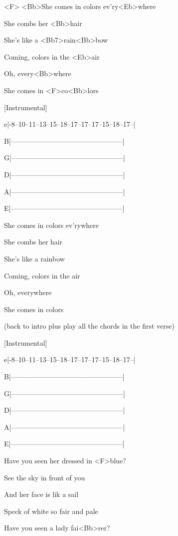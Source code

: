 

\zr
<F>    <Bb>She comes in colors ev'ry<Eb>where

She combs her <Bb>hair

She's like a <Bb7>rain<Bb>bow

Coming, colors in the <Eb>air

Oh, every<Bb>where

She comes in <F>co<Bb>lors
\kr

[Instrumental]

e|-8--10--11--13--15--18--17--17--17--15--18--17--| 

B|------------------------------------------------|  

G|------------------------------------------------|  

D|------------------------------------------------|

A|------------------------------------------------|

E|------------------------------------------------|

\zr
She comes in colors ev'rywhere

She combs her hair

She's like a rainbow

Coming, colors in the air

Oh, everywhere

She comes in colors
\kr

(back to intro plus play all the chords
in the first verse)


[Instrumental]

e|-8--10--11--13--15--18--17--17--17--15--18--17--| 

B|------------------------------------------------|  

G|------------------------------------------------|  

D|------------------------------------------------|

A|------------------------------------------------|

E|------------------------------------------------|


\zs
Have you seen her dressed in <F>blue?

See the sky in front of you

And her face is lik a sail

Speck of white so fair and pale

Have you seen a lady fai<Bb>rer?

